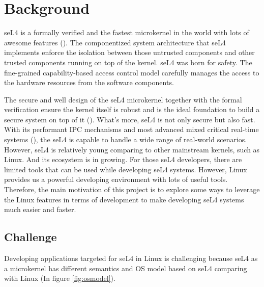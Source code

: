 \chapter{Background}\label{ch:background}

seL4 is a formally verified and the fastest microkernel in the world with lots of awesome features (\cite{Klein_EHACDEEKNSTW_09}). The componentized system architecture that seL4 implements enforce the isolation between those untrusted components and other trusted components running on top of the kernel. seL4 was born for safety. The fine-grained capability-based access control model carefully manages the access to the hardware resources from the software components. 

The secure and well design of the seL4 microkernel together with the formal verification ensure the kernel itself is robust and is the ideal foundation to build a secure system on top of it (\cite{Klein_AEHCDEEKNSTW_10}). What's more, seL4 is not only secure but also fast. With its performant IPC mechanisms and most advanced mixed critical real-time systems (\cite{Lyons_Heiser_14}), the seL4 is capable to handle a wide range of real-world scenarios. However, seL4 is relatively young comparing to other mainstream kernels, such as Linux. And its ecosystem is in growing. For those seL4 developers, there are limited tools that can be used while developing seL4 systems. However, Linux provides us a powerful developing environment with lots of useful tools. Therefore, the main motivation of this project is to explore some ways to leverage the Linux features in terms of development to make developing seL4 systems much easier and faster.

\section{Challenge}

Developing applications targeted for seL4 in Linux is challenging because seL4 as a microkernel has different semantics and OS model based on seL4 comparing with Linux (In figure \ref{fig:osmodel}).

